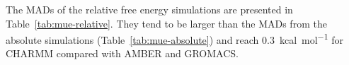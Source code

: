 \documentclass[journal=jctcce,manuscript=article]{achemso}
\begin{document}
The MADs of the relative free energy simulations are presented in 
Table~\ref{tab:mue-relative}.  They tend to be larger than the MADs from 
the absolute simulations (Table~\ref{tab:mue-absolute}) and reach 
\SI{0.3}{kcal.mol^{-1}} for CHARMM compared with AMBER and GROMACS.
\begin{table}[]
  \begin{minipage}{\linewidth}
    \caption{MAD (in \si{kcal.mol^{-1}}) comparing relative free energies from 
      relative simulations between SOMD, GROMACS, AMBER and 
      CHARMM.}\label{tab:mue-relative}
  \end{minipage}
\end{table}

\end{document}
